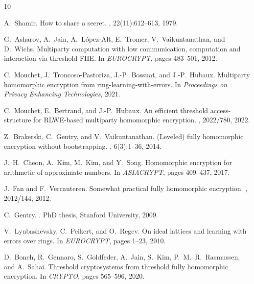 \documentclass[11pt,a4paper]{article}
\begin{document}

\begin{thebibliography}{10}

A.~Shamir.
\newblock How to share a secret.
, 22(11):612--613, 1979.

G.~Asharov, A.~Jain, A.~L{\'o}pez-Alt, E.~Tromer, V.~Vaikuntanathan, and D.~Wichs.
\newblock Multiparty computation with low communication, computation and interaction via threshold {FHE}.
\newblock In {\em EUROCRYPT}, pages 483--501, 2012.

C.~Mouchet, J.~Troncoso-Pastoriza, J.-P.~Bossuat, and J.-P.~Hubaux.
\newblock Multiparty homomorphic encryption from ring-learning-with-errors.
\newblock In {\em Proceedings on Privacy Enhancing Technologies}, 2021.

C.~Mouchet, E.~Bertrand, and J.-P.~Hubaux.
\newblock An efficient threshold access-structure for {RLWE}-based multiparty homomorphic encryption.
, 2022/780, 2022.

Z.~Brakerski, C.~Gentry, and V.~Vaikuntanathan.
\newblock ({L}eveled) fully homomorphic encryption without bootstrapping.
, 6(3):1--36, 2014.

J.~H.~Cheon, A.~Kim, M.~Kim, and Y.~Song.
\newblock Homomorphic encryption for arithmetic of approximate numbers.
\newblock In {\em ASIACRYPT}, pages 409--437, 2017.

J.~Fan and F.~Vercauteren.
\newblock Somewhat practical fully homomorphic encryption.
, 2012/144, 2012.

C.~Gentry.
.
\newblock PhD thesis, Stanford University, 2009.

V.~Lyubashevsky, C.~Peikert, and O.~Regev.
\newblock On ideal lattices and learning with errors over rings.
\newblock In {\em EUROCRYPT}, pages 1--23, 2010.

D.~Boneh, R.~Gennaro, S.~Goldfeder, A.~Jain, S.~Kim, P.~M.~R.~Rasmussen, and A.~Sahai.
\newblock Threshold cryptosystems from threshold fully homomorphic encryption.
\newblock In {\em CRYPTO}, pages 565--596, 2020.

\end{thebibliography}
\end{document}
